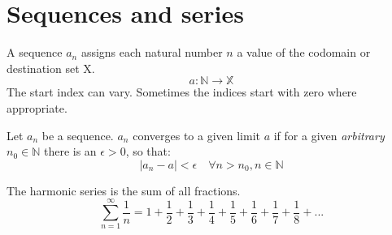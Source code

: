 \chapter{Sequences and series}

\begin{definition}[Sequence]
    A sequence $a_n$ assigns each natural number $n$ a value of the codomain or destination set X.
    \begin{equation}
        a:\mathbb{N} \rightarrow \mathbb{X}
    \end{equation}
    The start index can vary. Sometimes the indices start with zero where appropriate.
\end{definition}

\begin{theorem}
    Let $a_n$ be a sequence. 
    $a_n$ converges to a given limit $a$ if for a given \emph{arbitrary} $n_0 \in \mathbb{N}$ 
    there is an $\epsilon>0$, so that:
    \begin{equation}
        |a_n - a| < \epsilon \quad \forall n > n_0, n \in \mathbb{N}
    \end{equation}
\end{theorem}

\begin{definition}
    The harmonic series is the sum of all fractions.
    \begin{equation}
        \sum_{n=1}^{\infty}\frac{1}{n} = 
            1 + 
            \frac{1}{2} + 
            \frac{1}{3} + \frac{1}{4} + 
            \frac{1}{5} + \frac{1}{6} + \frac{1}{7} + \frac{1}{8} + ...
    \end{equation}
\end{definition}

